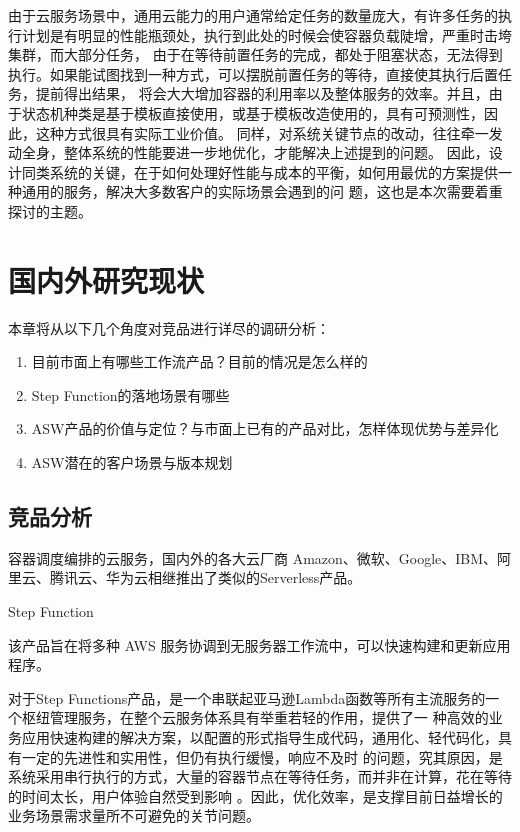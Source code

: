 \cite{wlfwyh}
由于云服务场景中，通用云能力的用户通常给定任务的数量庞大，有许多任务的执行计划是有明显的性能瓶颈处，执行到此处的时候会使容器负载陡增，严重时击垮集群，而大部分任务，
由于在等待前置任务的完成，都处于阻塞状态，无法得到执行。如果能试图找到一种方式，可以摆脱前置任务的等待，直接使其执行后置任务，提前得出结果，
将会大大增加容器的利用率以及整体服务的效率。并且，由于状态机种类是基于模板直接使用，或基于模板改造使用的，具有可预测性，因此，这种方式很具有实际工业价值。
同样，对系统关键节点的改动，往往牵一发动全身，整体系统的性能要进一步地优化，才能解决上述提到的问题。
\cite{jywfbpxt}
因此，设计同类系统的关键，在于如何处理好性能与成本的平衡，如何用最优的方案提供一种通用的服务，解决大多数客户的实际场景会遇到的问
题\cite{lu2021microservice}，这也是本次需要着重探讨的主题。


\section{国内外研究现状}

本章将从以下几个角度对竞品进行详尽的调研分析：
\begin{enumerate}
    \item 目前市面上有哪些工作流产品？目前的情况是怎么样的
    \item Step Function的落地场景有哪些
    \item ASW产品的价值与定位？与市面上已有的产品对比，怎样体现优势与差异化
    \item ASW潜在的客户场景与版本规划
\end{enumerate}

\subsection{竞品分析}

容器调度编排的云服务，国内外的各大云厂商 Amazon、微软、Google、IBM、阿里云、腾讯云、华为云相继推出了类似的Serverless产品。

Step Function

该产品旨在将多种 AWS 服务协调到无服务器工作流中，可以快速构建和更新应用程序\cite{jywfbpxt}。

对于Step Functions产品，是一个串联起亚马逊Lambda函数等所有主流服务的一个枢纽管理服务，在整个云服务体系具有举重若轻的作用，提供了一
种高效的业务应用快速构建的解决方案，以配置的形式指导生成代码，通用化、轻代码化，具有一定的先进性和实用性，但仍有执行缓慢，响应不及时
的问题，究其原因，是系统采用串行执行的方式，大量的容器节点在等待任务，而并非在计算，花在等待的时间太长，用户体验自然受到影响
\cite{jybpmsyc}。因此，优化效率，是支撑目前日益增长的业务场景需求量所不可避免的关节问题。

